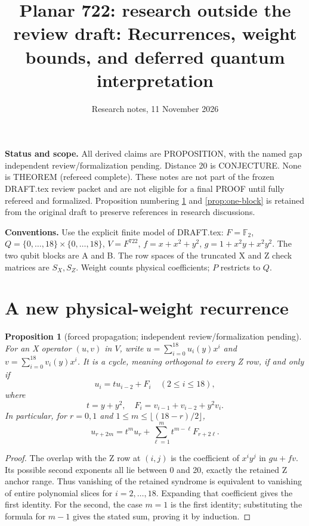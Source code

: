 \documentclass{article}
\title{Planar 722: research outside the review draft: Recurrences, weight bounds, and deferred quantum interpretation}
\author{}
\date{Research notes, 11 November 2026}
\newtheorem{proposition}{Proposition}
\begin{document}
\maketitle

\textbf{Status and scope.} All derived claims are PROPOSITION, with the named gap
independent review\slash formalization pending. Distance 20 is CONJECTURE. None is THEOREM
(refereed complete). These notes are not part of the frozen DRAFT.tex review packet and are
not eligible for a final PROOF until fully refereed and formalized. Proposition numbering
\ref{prop:recurrence} and \ref{prop:one-block} is retained from the original draft to
preserve references in research discussions.

\textbf{Conventions.} Use the explicit finite model of DRAFT.tex: \(F = \mathbb{F}_2\),
\(Q = \{0, \dots, 18\} \times \{0, \dots, 18\}\), \(V = F^{722}\), \(f = x + x^2 + y^2\),
\(g = 1 + x^2 y + x^2 y^2\). The two qubit blocks are A and B. The row spaces of the
truncated X and Z check matrices are \(S_X, S_Z\). Weight counts physical coefficients;
\(P\) restricts to \(Q\).

\section{A new physical-weight recurrence}\label{sec:recurrence}

\setcounter{proposition}{2}
\begin{proposition}[forced propagation; independent review\slash formalization pending]%
  \label{prop:recurrence}
  For an X operator \((u, v)\) in \(V\), write \(u = \sum_{i=0}^{18} u_i(y) x^i\) and
  \(v = \sum_{i=0}^{18} v_i(y) x^i\). It is a cycle, meaning orthogonal to every Z row, if
  and only if
  \begin{equation}
    u_i = t u_{i-2} + F_i \quad (2 \le i \le 18),
  \end{equation}
  where
  \begin{equation}
    t = y + y^2, \quad F_i = v_{i-1} + v_{i-2} + y^2 v_i.
  \end{equation}
  In particular, for \(r = 0, 1\) and \(1 \le m \le \lfloor (18 - r)/2 \rfloor\),
  \begin{equation}
    u_{r+2m} = t^m u_r + \sum_{\ell=1}^{m} t^{m-\ell} F_{r+2\ell}.
  \end{equation}
\end{proposition}

\begin{proof}
  The overlap with the Z row at \((i, j)\) is the coefficient of \(x^i y^j\) in
  \(gu + fv\). Its possible second exponents all lie between 0 and 20, exactly the
  retained Z anchor range. Thus vanishing of the retained syndrome is equivalent to
  vanishing of entire polynomial slices for \(i = 2, \dots, 18\). Expanding that
  coefficient gives the first identity. For the second, the case \(m = 1\) is the first
  identity; substituting the formula for \(m - 1\) gives the stated sum, proving it by
  induction.
\end{proof}
\end{document}
